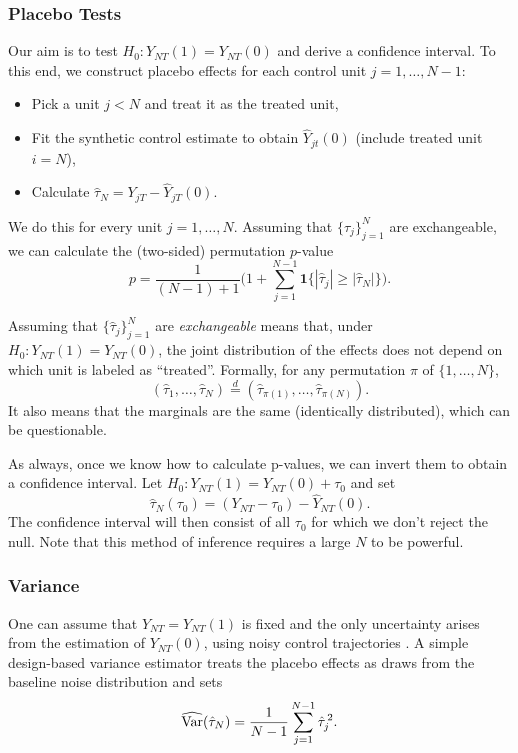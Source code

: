 \documentclass[11pt]{exam}
\begin{document}
\subsubsection{Placebo Tests}
Our aim is to test $H_0: Y_{NT}(1) = Y_{NT}(0)$ and derive a confidence interval.
To this end, we construct placebo effects for each control unit $j=1,\dots,N-1$:
\begin{itemize}
    \item Pick a unit $j < N$ and treat it as the treated unit,
    \item Fit the synthetic control estimate to obtain $\widehat Y_{jt}(0)$ (include treated unit $i=N$),
    \item Calculate $\hat \tau_N = Y_{jT} - \widehat Y_{jT}(0)$.
\end{itemize}
We do this for every unit $j = 1, \ldots, N$. Assuming that $\{\hat \tau_j\}_{j=1}^{N}$ are exchangeable, we can calculate the (two-sided) permutation $p$-value 
\[
  p
  = \frac{1}{(N-1)+1}
    \Biggl(
      1 + \sum_{j=1}^{N-1} \mathbf{1}\bigl\{|\hat\tau_j|\ge |\hat\tau_N|\bigr\}
    \Biggr).
\]

\begin{remark}
    Assuming that $\{\hat\tau_j\}_{j=1}^N$ are \emph{exchangeable} means that, under
$H_0 : Y_{NT}(1)=Y_{NT}(0)$, the joint distribution of the effects does not
depend on which unit is labeled as ``treated''. Formally, for any permutation
$\pi$ of $\{1,\dots,N\}$,
\[
  (\hat\tau_1,\dots,\hat\tau_N)
  \overset{d}{=} (\hat\tau_{\pi(1)},\dots,\hat\tau_{\pi(N)}).
\]
It also means that the marginals are the same (identically distributed), which can be questionable.
\end{remark}

As always, once we know how to calculate p-values, we can invert them to obtain a confidence interval. Let $H_0: Y_{NT}(1) = Y_{NT}(0) + \tau_0$ and set 
\[
    \hat \tau_N(\tau_0) = (Y_{NT} - \tau_0) - \widehat Y_{NT}(0).
\]
The confidence interval will then consist of all $\tau_0$ for which we don't reject the null.
Note that this method of inference requires a large $N$ to be powerful.


\subsubsection{Variance}
One can assume that $Y_{NT} = Y_{NT}(1)$ is fixed and the only uncertainty arises from the estimation of $Y_{NT}(0)$, using noisy
control trajectories \citep{doudchenko2016balancing}. A simple design-based variance estimator treats the
placebo effects as draws from the baseline noise distribution and sets
\[
  \widehat{\mathrm{Var}}(\hat\tau_N)
  = \frac{1}{N-1}\sum_{j=1}^{N-1} \hat\tau_j^{\,2}.
\]
\end{document}
